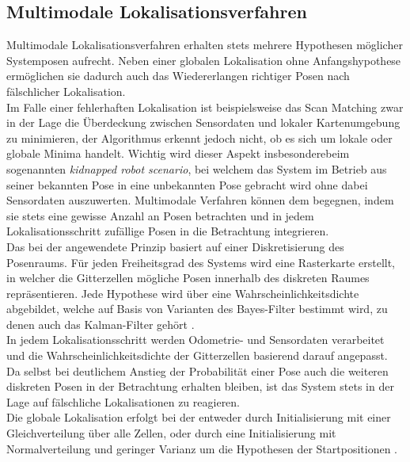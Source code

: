 \subsection{Multimodale Lokalisationsverfahren}
Multimodale Lokalisationsverfahren erhalten stets mehrere Hypothesen möglicher Systemposen aufrecht. Neben einer globalen Lokalisation ohne Anfangshypothese ermöglichen sie dadurch auch das Wiedererlangen richtiger Posen nach fälschlicher Lokalisation.\\
Im Falle einer fehlerhaften Lokalisation ist beispielsweise das Scan Matching zwar in der Lage die Überdeckung zwischen Sensordaten und lokaler Kartenumgebung zu minimieren, der Algorithmus erkennt jedoch nicht, ob es sich um lokale oder globale Minima handelt. Wichtig wird dieser Aspekt insbesondere beim sogenannten \textit{kidnapped robot scenario}, bei welchem das System im Betrieb aus seiner bekannten Pose in eine unbekannten Pose gebracht wird \cite{Yic2011} ohne dabei Sensordaten auszuwerten. Multimodale Verfahren können dem begegnen, indem sie stets eine gewisse Anzahl an Posen betrachten und in jedem Lokalisationsschritt zufällige Posen in die Betrachtung integrieren.\\

Das bei der  angewendete Prinzip basiert auf einer Diskretisierung des Posenraums. Für jeden Freiheitsgrad des Systems wird eine Rasterkarte erstellt, in welcher die Gitterzellen mögliche Posen innerhalb des diskreten Raumes repräsentieren. Jede Hypothese wird über eine Wahrscheinlichkeitsdichte abgebildet, welche auf Basis von Varianten des Bayes-Filter \red[erklären? wo?] bestimmt wird, zu denen auch das Kalman-Filter gehört \cite{Hertzberg2012}.\\
In jedem Lokalisationsschritt werden Odometrie-  und Sensordaten verarbeitet und die Wahrscheinlichkeitsdichte der Gitterzellen basierend darauf angepasst. Da selbst bei deutlichem Anstieg der Probabilität einer Pose auch die weiteren diskreten Posen in der Betrachtung erhalten bleiben, ist das System stets in der Lage auf fälschliche Lokalisationen zu reagieren.\\
Die globale Lokalisation erfolgt bei der  entweder durch Initialisierung mit einer Gleichverteilung über alle Zellen, oder durch eine Initialisierung mit Normalverteilung und geringer Varianz um die Hypothesen der Startpositionen \cite{Hertzberg2012}.\\

